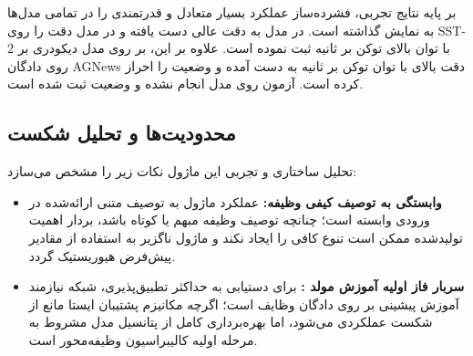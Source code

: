 بر پایه نتایج تجربی، فشرده‌ساز  عملکرد بسیار متعادل و قدرتمندی را در تمامی مدل‌ها به نمایش گذاشته است. در مدل  به دقت عالی  دست یافته و در مدل  دقت  را روی SST-2 با توان بالای  توکن بر ثانیه ثبت نموده است. علاوه بر این، بر روی مدل دیکودری  بر روی دادگان AGNews دقت بالای  با توان  توکن بر ثانیه به دست آمده و وضعیت  را احراز کرده است. آزمون روی مدل  انجام نشده و وضعیت  ثبت شده است.

\subsection{محدودیت‌ها و تحلیل شکست}
تحلیل ساختاری و تجربی این ماژول نکات زیر را مشخص می‌سازد:
\begin{itemize}
    \item \textbf{وابستگی به توصیف کیفی وظیفه:} عملکرد ماژول به توصیف متنی ارائه‌شده در ورودی وابسته است؛ چنانچه توصیف وظیفه مبهم یا کوتاه باشد، بردار اهمیت تولیدشده ممکن است تنوع کافی را ایجاد نکند و ماژول ناگزیر به استفاده از مقادیر پیش‌فرض هیوریستیک گردد.
    \item \textbf{سربار فاز اولیه آموزش مولد :} برای دستیابی به حداکثر تطبیق‌پذیری، شبکه  نیازمند آموزش پیشینی بر روی دادگان وظایف است؛ اگرچه مکانیزم پشتیبان ایستا مانع از شکست عملکردی می‌شود، اما بهره‌برداری کامل از پتانسیل مدل مشروط به مرحله اولیه کالیبراسیون وظیفه‌محور است.
\end{itemize}
